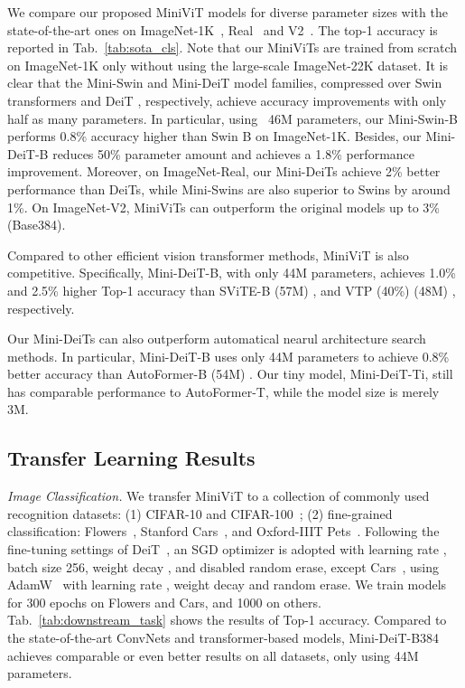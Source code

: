 \documentclass[10pt,twocolumn,letterpaper]{article}
\begin{document}
    We compare our proposed MiniViT models for diverse parameter sizes with the state-of-the-art ones on ImageNet-1K~\cite{imagenet}, Real~\cite{imagenet_real} and V2~\cite{imagenet_v2}. The top-1 accuracy is reported in Tab.~\ref{tab:sota_cls}. Note that our MiniViTs are trained from scratch on ImageNet-1K only without using the large-scale ImageNet-22K dataset.
    It is clear that the Mini-Swin and Mini-DeiT model families, compressed over Swin transformers \cite{Swin} and DeiT \cite{deit}, respectively, achieve accuracy improvements with only half as many parameters. In particular, using ~46M parameters, our Mini-Swin-B performs 0.8\% accuracy higher than Swin B on ImageNet-1K. Besides, our Mini-DeiT-B reduces 50\% parameter amount and achieves a 1.8\% performance improvement. Moreover, on ImageNet-Real, our Mini-DeiTs achieve 2\% better performance than DeiTs, while Mini-Swins are also superior to Swins by around 1\%. On ImageNet-V2, MiniViTs can outperform the original models up to 3\% (Base384).
    
    Compared to other efficient vision transformer methods, MiniViT is also competitive. Specifically, Mini-DeiT-B, with only 44M parameters, achieves 1.0\% and 2.5\% higher Top-1 accuracy than SViTE-B (57M) \cite{S2VIT},  and VTP (40\%) (48M) \cite{VTP}, respectively. 
    
    Our Mini-DeiTs can also outperform automatical nearul architecture search methods. In particular, Mini-DeiT-B uses only 44M parameters to achieve 0.8\% better accuracy than AutoFormer-B (54M) \cite{autoformer}. Our tiny model, Mini-DeiT-Ti, still has comparable performance to AutoFormer-T, while the model size is merely 3M.
    
        
    \subsection{Transfer Learning Results}
    
    \textit{Image Classification. } 
    We transfer MiniViT to a collection of commonly used recognition datasets: (1) CIFAR-10 and CIFAR-100~\cite{cifar}; (2) fine-grained classification: Flowers~\cite{flowers}, Stanford Cars~\cite{stanford_cars}, and Oxford-IIIT Pets~\cite{pet}. Following the fine-tuning settings of DeiT~\cite{deit}, an SGD optimizer is adopted with learning rate , batch size 256, weight decay , and disabled random erase, except Cars~\cite{stanford_cars}, using AdamW~\cite{adamw} with learning rate , weight decay  and random erase. We train models for 300 epochs on Flowers and Cars, and 1000 on others. Tab.~\ref{tab:downstream_task}
 shows the results of Top-1 accuracy. Compared to the state-of-the-art ConvNets and transformer-based models, Mini-DeiT-B384 achieves comparable or even better results on all datasets, only using 44M parameters. 
    
\end{document}
